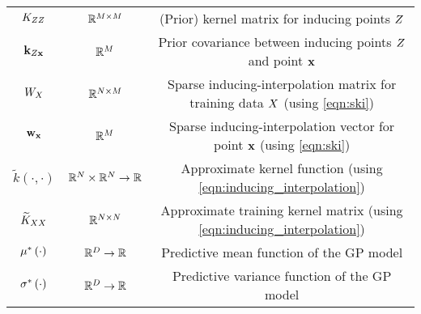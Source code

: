 \begin{table}[t!]
{\begin{tabular}{ ccc }
			$K_{ZZ}$ & $\mathbb{R}^{M \times M}$ & (Prior) kernel matrix for inducing points $Z$ \\
			$\mathbf{k}_{Z\mathbf{x}}$ & $\mathbb{R}^{M}$ & Prior covariance between inducing points $Z$ and point $\mathbf{x}$ \\
			$W_{X}$ & $\mathbb{R}^{N \times M}$ & Sparse inducing-interpolation matrix for training data $X$ (using \cref{eqn:ski}) \\
			$\mathbf{w}_{\mathbf{x}}$ & $\mathbb{R}^{M}$ & Sparse inducing-interpolation vector for point $\mathbf{x}$ (using \cref{eqn:ski}) \\
			\midrule
			$\widetilde k(\cdot, \cdot)$ & $\mathbb{R}^{N} \times \mathbb{R}^{N} \rightarrow \mathbb{R}$ & Approximate kernel function (using \cref{eqn:inducing_interpolation}) \\
			$\widetilde {K}_{XX}$ & $\mathbb{R}^{N \times N}$ & Approximate training kernel matrix (using \cref{eqn:inducing_interpolation}) \\
			\midrule
			$\mu^* \left(  \cdot  \right)$ & $\mathbb{R}^{D} \rightarrow \mathbb{R}$ & Predictive mean function of the GP model \\
			$\sigma^* \left(  \cdot  \right)$ & $\mathbb{R}^{D} \rightarrow \mathbb{R}$ & Predictive variance function of the GP model\\
			\bottomrule
		\end{tabular}
	}
\end{table}
\newpage
